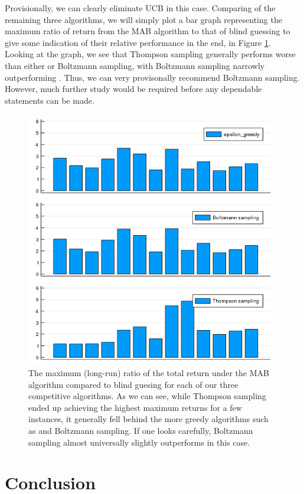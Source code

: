 Provisionally, we can clearly eliminate UCB in this case. Comparing of the remaining three algorithms, we will simply plot a bar graph representing the maximum ratio of return from the MAB algorithm to that of blind guessing to give some indication of their relative performance in the end, in Figure \ref{fig:mean_max_return_comp}. Looking at the graph, we see that Thompson sampling generally performs worse than either \eg or Boltzmann sampling, with Boltzmann sampling narrowly outperforming \eg. Thus, we can very provisonally recommend Boltzmann sampling. However, much further study would be required before any dependable statements can be made.

\begin{figure}
    \includegraphics[width=0.8\columnwidth]{mean_max_return_comp.png}
    \caption{The maximum (long-run) ratio of the total return under the MAB algorithm compared to blind guesing for each of our three competitive algorithms. As we can see, while Thompson sampling ended up achieving the highest maximum returns for a few instances, it generally fell behind the more greedy algorithms such as \eg and Boltzmann sampling. If one looks carefully, Boltzmann sampling almost universally slightly outperforms \eg in this case.}
    \label{fig:mean_max_return_comp}
\end{figure}

\section{Conclusion}

